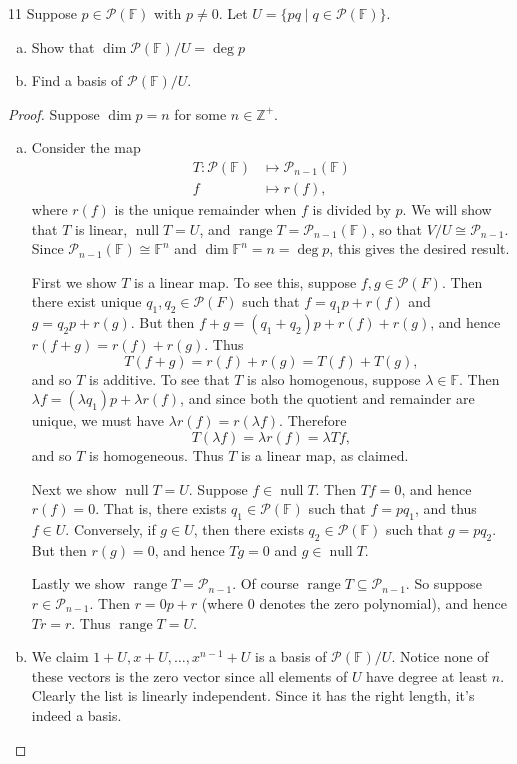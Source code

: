 \documentclass{extarticle}
\newenvironment{problem}[1]{\begin{prob*}{#1}{}}{\end{prob*}}
\newcommand{\Z}{\mathbb{Z}}
\newcommand{\F}{\mathbb{F}}
\newcommand{\poly}{\mathcal{P}}
\DeclareMathOperator{\Null}{null}
\DeclareMathOperator{\Range}{range}
\begin{document}
\begin{problem}{11}
Suppose $p\in\poly(\F)$ with $p\neq 0$.  Let $U=\{pq\mid q\in\poly(\F)\}$.
\begin{enumerate}[(a)]
\item Show that $\dim\poly(\F)/U = \deg p$
\item Find a basis of $\poly(\F)/U$.
\end{enumerate}
\end{problem}
\begin{proof}
Suppose $\dim p=n$ for some $n\in\Z^+$.
\begin{enumerate}[(a)]
\item Consider the map
\begin{align*}
T:\poly(\F) &\mapsto \poly_{n-1}(\F)\\
f &\mapsto r(f),
\end{align*}
where $r(f)$ is the unique remainder when $f$ is divided by $p$.  We will show that $T$ is linear, $\Null T = U$, and $\Range T = \poly_{n - 1}(\F)$, so that $V/U\cong \poly_{n - 1}$.  Since $\poly_{n-1}(\F)\cong \F^n$ and $\dim\F^n = n = \deg p$, this gives the desired result.\\
\par First we show $T$ is a linear map.  To see this, suppose $f,g\in\poly(F)$.  Then there exist unique $q_1,q_2\in\poly(F)$ such that $f = q_1p + r(f)$ and $g = q_2p + r(g)$.  But then $f + g = (q_1 + q_2)p + r(f) + r(g)$, and hence $r(f+g) = r(f)+r(g)$.  Thus
\begin{equation*}
T(f + g) = r(f) + r(g) = T(f) + T(g),
\end{equation*}
and so $T$ is additive.  To see that $T$ is also homogenous, suppose $\lambda\in\F$.  Then $\lambda f = (\lambda q_1)p + \lambda r(f)$, and since both the quotient and remainder are unique, we must have $\lambda r(f) = r(\lambda f)$.  Therefore
\begin{equation*}
T(\lambda f) = \lambda r(f) = \lambda Tf,
\end{equation*}
and so $T$ is homogeneous.  Thus $T$ is a linear map, as claimed.\\
\par Next we show $\Null T= U$.  Suppose $f\in \Null T$.  Then $Tf = 0$, and hence $r(f) = 0$.  That is, there exists $q_1\in \poly(\F)$ such that $f = pq_1$, and thus $f\in U$.  Conversely, if $g\in U$, then there exists $q_2\in\poly(\F)$ such that $g = pq_2$.  But then $r(g)=0$, and hence $Tg =0$ and $g\in\Null T$.\\
\par Lastly we show $\Range T = \poly_{n-1}$.  Of course $\Range T\subseteq \poly_{n-1}$.  So suppose $r \in \poly_{n-1}$.  Then $r = 0p + r$ (where $0$ denotes the zero polynomial), and hence $Tr = r$.  Thus $\Range T = U$.
\item We claim $1+U, x+U,\dots, x^{n-1}+U$ is a basis of $\poly(\F)/U$.  Notice none of these vectors is the zero vector since all elements of $U$ have degree at least $n$.  Clearly the list is linearly independent.  Since it has the right length, it's indeed a basis.  \qedhere
\end{enumerate}
\end{proof}
\end{document}
